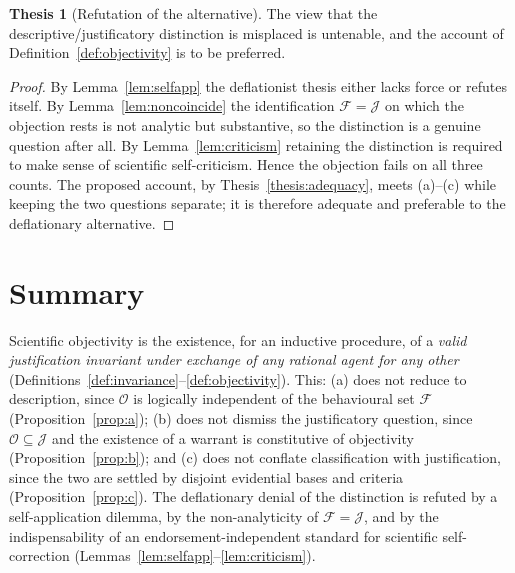 \documentclass{amsart}
\theoremstyle{definition}
\newtheorem{thesis}{Thesis}
\theoremstyle{plain}
\begin{document}
\begin{thesis}[Refutation of the alternative]\label{thesis:refute}
The view that the descriptive/justificatory distinction is misplaced is
untenable, and the account of Definition~\ref{def:objectivity} is to be
preferred.
\end{thesis}

\begin{proof}
By Lemma~\ref{lem:selfapp} the deflationist thesis either lacks force or
refutes itself. By Lemma~\ref{lem:noncoincide} the identification
$\mathcal{F}=\mathcal{J}$ on which the objection rests is not analytic but
substantive, so the distinction is a genuine question after all. By
Lemma~\ref{lem:criticism} retaining the distinction is required to make sense of
scientific self-criticism. Hence the objection fails on all three counts. The
proposed account, by Thesis~\ref{thesis:adequacy}, meets (a)--(c) while keeping
the two questions separate; it is therefore adequate and preferable to the
deflationary alternative.
\end{proof}

\section{Summary}

Scientific objectivity is the existence, for an inductive procedure, of a
\emph{valid justification invariant under exchange of any rational agent for
any other} (Definitions~\ref{def:invariance}--\ref{def:objectivity}). This:
(a) does not reduce to description, since $\mathcal{O}$ is logically
independent of the behavioural set $\mathcal{F}$
(Proposition~\ref{prop:a}); (b) does not dismiss the justificatory question,
since $\mathcal{O}\subseteq\mathcal{J}$ and the existence of a warrant is
constitutive of objectivity (Proposition~\ref{prop:b}); and (c) does not
conflate classification with justification, since the two are settled by
disjoint evidential bases and criteria (Proposition~\ref{prop:c}). The
deflationary denial of the distinction is refuted by a self-application dilemma,
by the non-analyticity of $\mathcal{F}=\mathcal{J}$, and by the indispensability
of an endorsement-independent standard for scientific self-correction
(Lemmas~\ref{lem:selfapp}--\ref{lem:criticism}).
\end{document}
